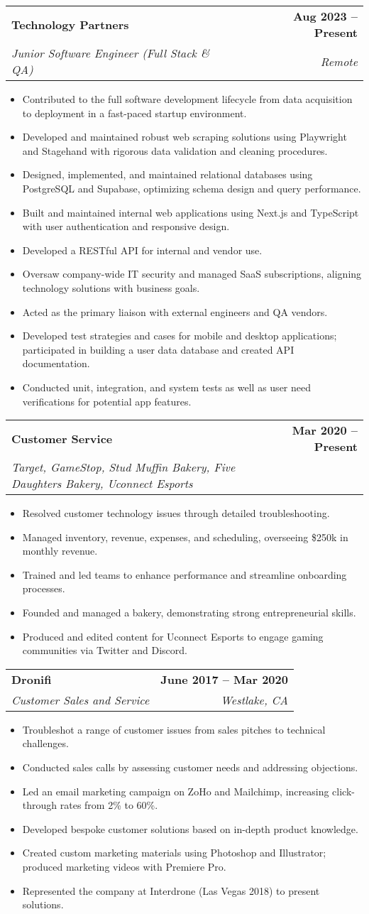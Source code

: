 \documentclass[letterpaper,11pt]{article}
\makeatletter
\newcommand{\resumeItem}[1]{
  \item\small{
    {#1 \vspace{-2pt}}
  }
}
\newcommand{\resumeSubheading}[4]{
  \vspace{-2pt}\item
    \begin{tabular*}{1.0\textwidth}[t]{l@{\extracolsep{\fill}}r}
      \textbf{#1} & \textbf{\small #2} \\
      \textit{\small #3} & \textit{\small #4} \\
    \end{tabular*}\vspace{-7pt}
}
\newcommand{\resumeItemListStart}{\begin{itemize}}
\newcommand{\resumeItemListEnd}{\end{itemize}\vspace{-5pt}}
\makeatother
\begin{document}
\begin{left}
    \resumeSubheading
      {Technology Partners}{Aug 2023 -- Present}
      {Junior Software Engineer (Full Stack \& QA)}{Remote}
      \resumeItemListStart
          \resumeItem{Contributed to the full software development lifecycle from data acquisition to deployment in a fast-paced startup environment.}
          \resumeItem{Developed and maintained robust web scraping solutions using Playwright and Stagehand with rigorous data validation and cleaning procedures.}
          \resumeItem{Designed, implemented, and maintained relational databases using PostgreSQL and Supabase, optimizing schema design and query performance.}
          \resumeItem{Built and maintained internal web applications using Next.js and TypeScript with user authentication and responsive design.}
          \resumeItem{Developed a RESTful API for internal and vendor use.}
          \resumeItem{Oversaw company-wide IT security and managed SaaS subscriptions, aligning technology solutions with business goals.}
          \resumeItem{Acted as the primary liaison with external engineers and QA vendors.}
          \resumeItem{Developed test strategies and cases for mobile and desktop applications; participated in building a user data database and created API documentation.}
          \resumeItem{Conducted unit, integration, and system tests as well as user need verifications for potential app features.}
      \resumeItemListEnd

    \resumeSubheading
      {Customer Service}{Mar 2020 -- Present}
      {Target, GameStop, Stud Muffin Bakery, Five Daughters Bakery, Uconnect Esports}{}
      \resumeItemListStart
          \resumeItem{Resolved customer technology issues through detailed troubleshooting.}
          \resumeItem{Managed inventory, revenue, expenses, and scheduling, overseeing \$250k in monthly revenue.}
          \resumeItem{Trained and led teams to enhance performance and streamline onboarding processes.}
          \resumeItem{Founded and managed a bakery, demonstrating strong entrepreneurial skills.}
          \resumeItem{Produced and edited content for Uconnect Esports to engage gaming communities via Twitter and Discord.}
      \resumeItemListEnd

    \resumeSubheading
      {Dronifi}{June 2017 -- Mar 2020}
      {Customer Sales and Service}{Westlake, CA}
      \resumeItemListStart
          \resumeItem{Troubleshot a range of customer issues from sales pitches to technical challenges.}
          \resumeItem{Conducted sales calls by assessing customer needs and addressing objections.}
          \resumeItem{Led an email marketing campaign on ZoHo and Mailchimp, increasing click-through rates from 2\% to 60\%.}
          \resumeItem{Developed bespoke customer solutions based on in-depth product knowledge.}
          \resumeItem{Created custom marketing materials using Photoshop and Illustrator; produced marketing videos with Premiere Pro.}
          \resumeItem{Represented the company at Interdrone (Las Vegas 2018) to present solutions.}
      \resumeItemListEnd


\end{left}
\end{document}
